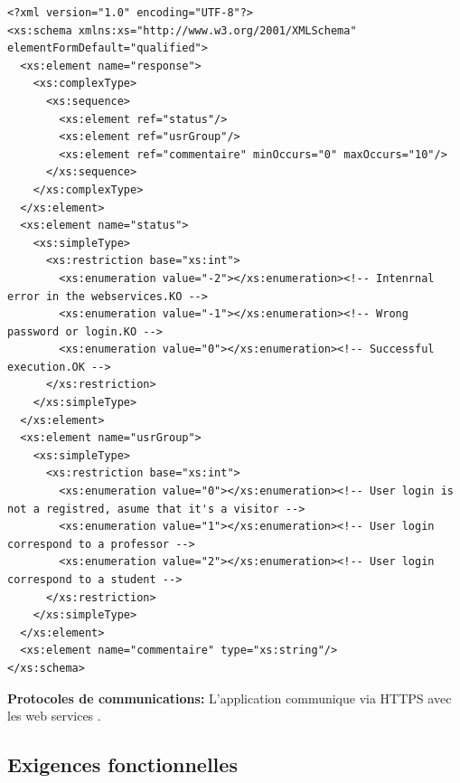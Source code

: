  \begin{lstlisting}[language=XSD,caption = Exemple de XML Schema fournit au service informatique de l'USJ]
<?xml version="1.0" encoding="UTF-8"?>
<xs:schema xmlns:xs="http://www.w3.org/2001/XMLSchema" elementFormDefault="qualified">
  <xs:element name="response">
    <xs:complexType>
      <xs:sequence>
        <xs:element ref="status"/>
        <xs:element ref="usrGroup"/>
        <xs:element ref="commentaire" minOccurs="0" maxOccurs="10"/>
      </xs:sequence>
    </xs:complexType>
  </xs:element>
  <xs:element name="status">
    <xs:simpleType>
      <xs:restriction base="xs:int">
        <xs:enumeration value="-2"></xs:enumeration><!-- Intenrnal error in the webservices.KO -->
        <xs:enumeration value="-1"></xs:enumeration><!-- Wrong password or login.KO -->
        <xs:enumeration value="0"></xs:enumeration><!-- Successful execution.OK -->
      </xs:restriction>
    </xs:simpleType>
  </xs:element>
  <xs:element name="usrGroup">
    <xs:simpleType>
      <xs:restriction base="xs:int">
        <xs:enumeration value="0"></xs:enumeration><!-- User login is not a registred, asume that it's a visitor -->
        <xs:enumeration value="1"></xs:enumeration><!-- User login correspond to a professor -->
        <xs:enumeration value="2"></xs:enumeration><!-- User login correspond to a student -->
      </xs:restriction>
    </xs:simpleType>
  </xs:element>
  <xs:element name="commentaire" type="xs:string"/>
</xs:schema>
			\end{lstlisting}

	\textbf{Protocoles de communications:} L'application communique via HTTPS avec les web services . \\[0.2cm]
	
	
	
	\subsection{Exigences fonctionnelles \label{exigenceFoction}}
